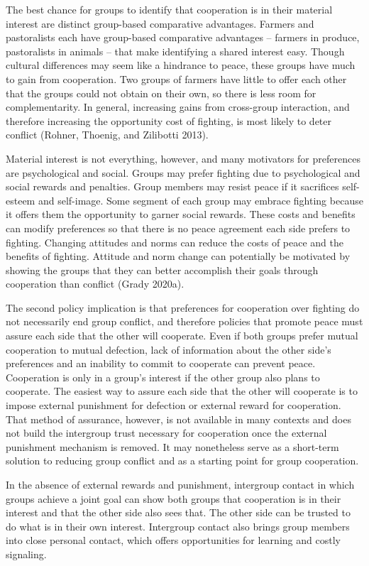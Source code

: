 \documentclass[11pt]{article}
\begin{document}
The best chance for groups to identify that cooperation is in their
material interest are distinct group-based comparative advantages.
Farmers and pastoralists each have group-based comparative advantages --
farmers in produce, pastoralists in animals -- that make identifying a
shared interest easy. Though cultural differences may seem like a
hindrance to peace, these groups have much to gain from cooperation. Two
groups of farmers have little to offer each other that the groups could
not obtain on their own, so there is less room for complementarity. In
general, increasing gains from cross-group interaction, and therefore
increasing the opportunity cost of fighting, is most likely to deter
conflict (Rohner, Thoenig, and Zilibotti 2013).

Material interest is not everything, however, and many motivators for
preferences are psychological and social. Groups may prefer fighting due
to psychological and social rewards and penalties. Group members may
resist peace if it sacrifices self-esteem and self-image. Some segment
of each group may embrace fighting because it offers them the
opportunity to garner social rewards. These costs and benefits can
modify preferences so that there is no peace agreement each side prefers
to fighting. Changing attitudes and norms can reduce the costs of peace
and the benefits of fighting. Attitude and norm change can potentially
be motivated by showing the groups that they can better accomplish their
goals through cooperation than conflict (Grady 2020a).

The second policy implication is that preferences for cooperation over
fighting do not necessarily end group conflict, and therefore policies
that promote peace must assure each side that the other will cooperate.
Even if both groups prefer mutual cooperation to mutual defection, lack
of information about the other side's preferences and an inability to
commit to cooperate can prevent peace. Cooperation is only in a group's
interest if the other group also plans to cooperate. The easiest way to
assure each side that the other will cooperate is to impose external
punishment for defection or external reward for cooperation. That method
of assurance, however, is not available in many contexts and does not
build the intergroup trust necessary for cooperation once the external
punishment mechanism is removed. It may nonetheless serve as a
short-term solution to reducing group conflict and as a starting point
for group cooperation.

In the absence of external rewards and punishment, intergroup contact in
which groups achieve a joint goal can show both groups that cooperation
is in their interest and that the other side also sees that. The other
side can be trusted to do what is in their own interest. Intergroup
contact also brings group members into close personal contact, which
offers opportunities for learning and costly signaling.
\end{document}
